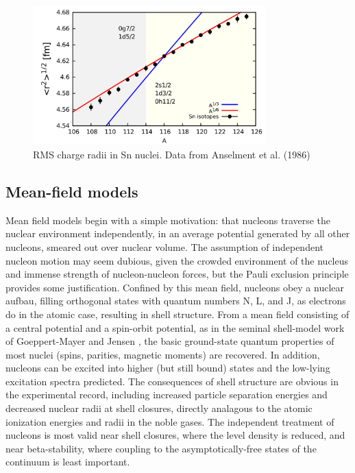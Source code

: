 \begin{figure}
    \includegraphics[width=0.8\textwidth]{figures/SnIsotopeRMSRadii.png}
    \caption{RMS charge radii in Sn nuclei. Data from Anselment et al. (1986)}
    \label{SnIsotopeShift}
\end{figure}

\subsection{Mean-field models}
Mean field models begin with a simple motivation: that nucleons
traverse the nuclear environment independently, in an average
potential generated by all other nucleons, smeared out over nuclear volume.
The assumption of independent nucleon motion may seem dubious, given the
crowded environment of the nucleus and immense strength of nucleon-nucleon forces,
but the Pauli exclusion principle provides some justification.
Confined by this mean field, nucleons obey a nuclear aufbau, filling orthogonal states with
quantum numbers N, L, and J, as electrons do in the atomic case, resulting in
shell structure. From a mean field consisting of a central
potential and a spin-orbit potential, as in the seminal shell-model work of Goeppert-Mayer
and Jensen \cite{GoeppertMayer1955}, the basic ground-state quantum properties of most nuclei
(spins, parities, magnetic moments) are recovered. In addition, nucleons can be
excited into higher (but still bound) states and the low-lying excitation
spectra predicted. The consequences of shell structure are obvious
in the experimental record, including increased particle separation 
energies and decreased nuclear radii at shell closures, directly analagous to
the atomic ionization energies and radii in the noble gases. The independent
treatment of nucleons is most valid near shell closures,
where the level density is reduced, and near beta-stability, where coupling to
the asymptotically-free states of the continuum is least important.

